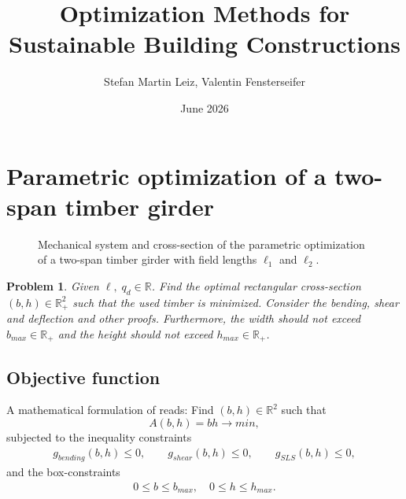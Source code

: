 \documentclass[a4paper]{article}
\title{Optimization Methods for Sustainable Building Constructions}
\author{Stefan Martin Leiz, Valentin Fensterseifer}
\date{June 2026}
\newtheorem{problem}{Problem}
\newcommand{\R}{\mathbb{R}}
\begin{document}
\maketitle
\begin{abstract}

\end{abstract}


\tableofcontents
\clearpage
\section{Parametric optimization of a two-span timber girder}
\begin{figure}[H]
    \centering
    \caption{Mechanical system and cross-section of the parametric optimization of a two-span timber girder with field lengths $\ell_1$ and $\ell_2$.}
    \label{fig:beam}
\end{figure}
	 \begin{problem}\label{prob:timeber}
	     Given $\ell,\; q_d\in\R$. Find the optimal rectangular cross-section $(b,h)\in \mathbb R^2_+$ such that the used timber is minimized. Consider the bending, shear and deflection and other proofs.
    Furthermore, the width should not exceed $b_{max}\in\R_+$ and the height should not exceed $h_{max}\in\R_+$.
\end{problem}
\subsection{Objective function}

A mathematical formulation of  reads: Find $(b,h)\in \mathbb R^2$ such that
	\begin{equation*}
		A(b,h) = b h  \rightarrow min,
	\end{equation*}
	subjected to the inequality constraints
	\begin{align*}
		g_{bending}(b,h) \le 0, \qquad g_{shear}(b,h) \le 0, \qquad
		g_{SLS}(b,h) \le 0,
	\end{align*}
	and the box-constraints
	\begin{align*}
	0\le b \le b_{max},\quad 0\le h \le h_{max}.
	\end{align*}
\end{document}
